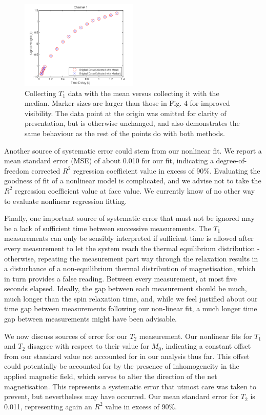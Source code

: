 \documentclass[aps,prl,nofootinbib,twocolumn,superscriptaddress,groupedaddress]{revtex4}  %
\begin{document}
\begin{figure}[b]
\centering
\includegraphics[width=0.5\textwidth]{../Analysis/T1analysis.png} 
\caption{Collecting $T_{1}$ data with the mean versus collecting it with the median. Marker sizes are larger than those in Fig. 4 for improved visibility. The data point at the origin was omitted for clarity of presentation, but is otherwise unchanged, and also demonstrates the same behaviour as the rest of the points do with both methods.} 
\end{figure}

Another source of systematic error could stem from our nonlinear fit. We report a mean standard error (MSE) of about 0.010 for our fit, indicating a degree-of-freedom corrected $R^{2}$ regression coefficient value in excess of 90\%. Evaluating the goodness of fit of a nonlinear model is complicated, and we advise not to take the $R^{2}$ regression coefficient value at face value. We currently know of no other way to evaluate nonlinear regression fitting.

Finally, one important source of systematic error that must not be ignored may be a lack of sufficient time between successive measurements. The $T_{1}$ measurements can only be sensibly interpreted if sufficient time is allowed after every measurement to let the system reach the thermal equilibrium distribution - otherwise, repeating the measurement part way through the relaxation results in a disturbance of a non-equilibrium thermal distribution of magnetisation, which in turn provides a false reading. Between every measurement, at most five seconds elapsed. Ideally, the gap between each measurement should be much, much longer than the spin relaxation time, and, while we feel justified about our time gap between measurements following our non-linear fit, a much longer time gap between measurements might have been advisable.

We now discuss sources of error for our $T_{2}$ measurement. Our nonlinear fits for $T_{1}$ and $T_{2}$ disagree with respect to their value for $M_{0}$, indicating a constant offset from our standard value not accounted for in our analysis thus far. This offset could potentially be accounted for by the presence of inhomogeneity in the applied magnetic field, which serves to alter the direction of the net magnetisation. This represents a systematic error that utmost care was taken to prevent, but nevertheless may have occurred. Our mean standard error for $T_{2}$ is 0.011, representing again an $R^{2}$ value in excess of 90\%. 
\end{document}
